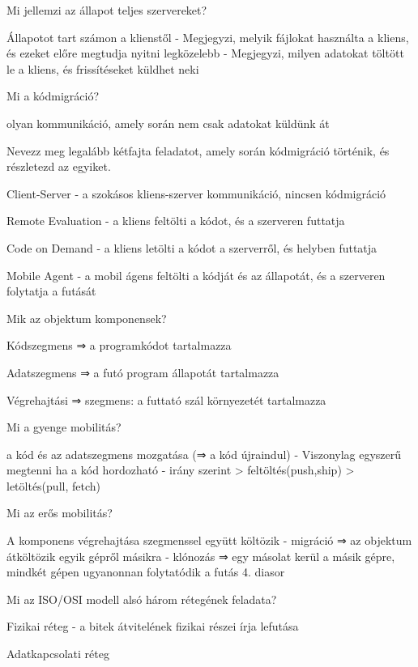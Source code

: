 \documentclass[12pt]{article}
\begin{document}
\begin{description}
    \item  Mi jellemzi az állapot teljes szervereket?
    \item Állapotot tart számon a klienstől
        - Megjegyzi, melyik fájlokat használta a kliens, és ezeket előre megtudja nyitni legközelebb
        - Megjegyzi, milyen adatokat töltött le a kliens, és frissítéseket küldhet neki
    \item  Mi a kódmigráció?
    \item olyan kommunikáció, amely során nem csak adatokat küldünk át
    \item  Nevezz meg legalább kétfajta feladatot, amely során kódmigráció történik, és részletezd az egyiket.
    \item Client-Server
        - a szokásos kliens-szerver kommunikáció, nincsen kódmigráció
    \item Remote Evaluation 
        - a kliens feltölti a kódot, és a szerveren futtatja
    \item Code on Demand 
        - a kliens letölti a kódot a szerverről, és helyben futtatja
    \item Mobile Agent 
        - a mobil ágens feltölti a kódját és az állapotát, és a szerveren folytatja a futását
    \item  Mik az objektum komponensek?
    \item Kódszegmens  ⇒ a programkódot tartalmazza
    \item Adatszegmens ⇒ a futó program állapotát tartalmazza
    \item Végrehajtási ⇒ szegmens: a futtató szál környezetét tartalmazza
    \item  Mi a gyenge mobilitás?
    \item a kód és az adatszegmens mozgatása (⇒ a kód újraindul)
        - Viszonylag egyszerű megtenni ha a kód hordozható
        - irány szerint
        > feltöltés(push,ship)
        > letöltés(pull, fetch)
    \item  Mi az erős mobilitás?
    \item A komponens végrehajtása szegmenssel együtt költözik
        - migráció ⇒ az objektum átköltözik egyik gépről másikra
        - klónozás ⇒ egy másolat kerül a másik gépre, mindkét gépen ugyanonnan folytatódik a futás
        4. diasor
    \item  Mi az ISO/OSI modell alsó három rétegének feladata?
    \item Fizikai réteg
        - a bitek átvitelének fizikai részei írja lefutása
    \item Adatkapcsolati réteg

\end{description}
\end{document}
